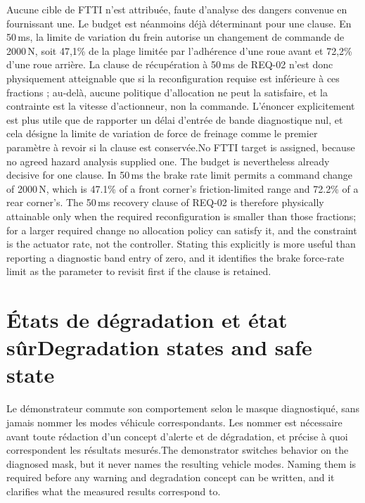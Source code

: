 \documentclass[11pt,a4paper,oneside]{report}
\newcommand{\bi}[2]{\iffrench #2\else #1\fi}
\renewcommand{\sec}[2]{\section{\bi{#1}{#2}}}
\begin{document}
\bi{No FTTI target is assigned, because no agreed hazard analysis supplied one. The budget is nevertheless already decisive for one clause. In 50\,ms the brake rate limit permits a command change of 2000\,N, which is 47.1\% of a front corner's friction-limited range and 72.2\% of a rear corner's. The 50\,ms recovery clause of REQ-02 is therefore physically attainable only when the required reconfiguration is smaller than those fractions; for a larger required change no allocation policy can satisfy it, and the constraint is the actuator rate, not the controller. Stating this explicitly is more useful than reporting a diagnostic band entry of zero, and it identifies the brake force-rate limit as the parameter to revisit first if the clause is retained.}{Aucune cible de FTTI n'est attribuée, faute d'analyse des dangers convenue en fournissant une. Le budget est néanmoins déjà déterminant pour une clause. En 50\,ms, la limite de variation du frein autorise un changement de commande de 2000\,N, soit 47,1\% de la plage limitée par l'adhérence d'une roue avant et 72,2\% d'une roue arrière. La clause de récupération à 50\,ms de REQ-02 n'est donc physiquement atteignable que si la reconfiguration requise est inférieure à ces fractions ; au-delà, aucune politique d'allocation ne peut la satisfaire, et la contrainte est la vitesse d'actionneur, non la commande. L'énoncer explicitement est plus utile que de rapporter un délai d'entrée de bande diagnostique nul, et cela désigne la limite de variation de force de freinage comme le premier paramètre à revoir si la clause est conservée.}

\sec{Degradation states and safe state}{États de dégradation et état sûr}\label{sec:states}
\bi{The demonstrator switches behavior on the diagnosed mask, but it never names the resulting vehicle modes. Naming them is required before any warning and degradation concept can be written, and it clarifies what the measured results correspond to.}{Le démonstrateur commute son comportement selon le masque diagnostiqué, sans jamais nommer les modes véhicule correspondants. Les nommer est nécessaire avant toute rédaction d'un concept d'alerte et de dégradation, et précise à quoi correspondent les résultats mesurés.}
\end{document}
